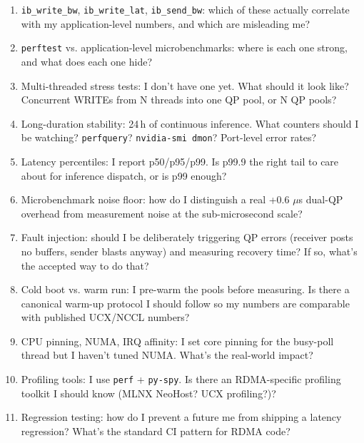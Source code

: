 \documentclass[11pt]{article}
\begin{document}
\begin{enumerate}
\item \texttt{ib\_write\_bw}, \texttt{ib\_write\_lat},
\texttt{ib\_send\_bw}: which of these actually correlate with
my application-level numbers, and which are misleading me?

\item \texttt{perftest} vs. application-level microbenchmarks: where
is each one strong, and what does each one hide?

\item Multi-threaded stress tests: I don't have one yet. What should
it look like? Concurrent WRITEs from N threads into one QP pool, or
N QP pools?

\item Long-duration stability: 24\,h of continuous inference. What
counters should I be watching? \texttt{perfquery}? \texttt{nvidia-smi
dmon}? Port-level error rates?

\item Latency percentiles: I report p50/p95/p99. Is p99.9 the right
tail to care about for inference dispatch, or is p99 enough?

\item Microbenchmark noise floor: how do I distinguish a real +0.6
$\mu$s dual-QP overhead from measurement noise at the sub-microsecond
scale?

\item Fault injection: should I be deliberately triggering QP errors
(receiver posts no buffers, sender blasts anyway) and measuring
recovery time? If so, what's the accepted way to do that?

\item Cold boot vs. warm run: I pre-warm the pools before measuring.
Is there a canonical warm-up protocol I should follow so my numbers
are comparable with published UCX/NCCL numbers?

\item CPU pinning, NUMA, IRQ affinity: I set core pinning for the
busy-poll thread but I haven't tuned NUMA. What's the real-world
impact?

\item Profiling tools: I use \texttt{perf} + \texttt{py-spy}.
Is there an RDMA-specific profiling toolkit I should know (MLNX
NeoHost? UCX profiling?)?

\item Regression testing: how do I prevent a future me from shipping
a latency regression? What's the standard CI pattern for RDMA code?
\end{enumerate}
\end{document}
